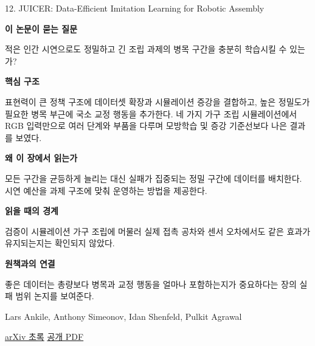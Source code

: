 \documentclass[11pt,openany]{book}
\begin{document}
\begin{termcard}{12. JUICER: Data-Efficient Imitation Learning for Robotic Assembly}

\par

\medskip

{\sffamily\bfseries\color{deepblue} 이 논문이 묻는 질문}\par

적은 인간 시연으로도 정밀하고 긴 조립 과제의 병목 구간을 충분히 학습시킬 수 있는가?

\smallskip

{\sffamily\bfseries\color{deepblue} 핵심 구조}\par

표현력이 큰 정책 구조에 데이터셋 확장과 시뮬레이션 증강을 결합하고, 높은 정밀도가 필요한 병목 부근에 국소 교정 행동을 추가한다. 네 가지 가구 조립 시뮬레이션에서 RGB 입력만으로 여러 단계와 부품을 다루며 모방학습 및 증강 기준선보다 나은 결과를 보였다.

\smallskip

{\sffamily\bfseries\color{deepblue} 왜 이 장에서 읽는가}\par

모든 구간을 균등하게 늘리는 대신 실패가 집중되는 정밀 구간에 데이터를 배치한다. 시연 예산을 과제 구조에 맞춰 운영하는 방법을 제공한다.

\smallskip

{\sffamily\bfseries\color{coral} 읽을 때의 경계}\par

검증이 시뮬레이션 가구 조립에 머물러 실제 접촉 공차와 센서 오차에서도 같은 효과가 유지되는지는 확인되지 않았다.

\smallskip

{\sffamily\bfseries\color{teal} 원책과의 연결}\par

좋은 데이터는 총량보다 병목과 교정 행동을 얼마나 포함하는지가 중요하다는 장의 실패 범위 논지를 보여준다.

\medskip

{\footnotesize\color{muted} Lars Ankile, Anthony Simeonov, Idan Shenfeld, Pulkit Agrawal\par

\href{https://arxiv.org/abs/2404.03729}{arXiv 초록} \quad \href{https://arxiv.org/pdf/2404.03729}{공개 PDF}\par}

\end{termcard}
\end{document}
